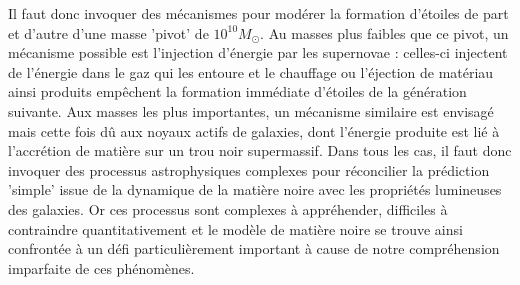 Il faut donc invoquer des mécanismes pour modérer la formation d'étoiles de part et d'autre d'une masse 'pivot' de $10^{10} M_\odot$. Au masses plus faibles que ce pivot, un mécanisme possible est l'injection d'énergie par les supernovae : celles-ci injectent de l'énergie dans le gaz qui les entoure et le chauffage ou l'éjection de matériau ainsi produits empêchent la formation immédiate d'étoiles de la génération suivante. Aux masses les plus importantes, un mécanisme similaire est envisagé mais cette fois dû aux noyaux actifs de galaxies, dont l'énergie produite est lié à l'accrétion de matière sur un trou noir supermassif. Dans tous les cas, il faut donc invoquer des processus astrophysiques complexes pour réconcilier la prédiction 'simple' issue de la dynamique de la matière noire avec les propriétés lumineuses des galaxies. Or ces processus sont complexes à appréhender, difficiles à contraindre quantitativement et le modèle de matière noire se trouve ainsi confrontée à un défi particulièrement important à cause de notre compréhension imparfaite de ces phénomènes.

